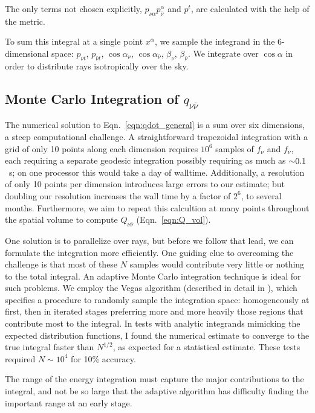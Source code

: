 The only terms not chosen explicitly, $p_{\nu \alpha} p_{\bar{\nu}}^\alpha$
and $p^t$, are calculated with the help of the metric.

To sum this integral at a single point $x^\alpha$,
we sample the integrand in the 6-dimensional space:
$p_{\nu t}$,
$p_{\bar{\nu} t}$,
$\cos \alpha_{\nu}$,
$\cos \alpha_{\bar{\nu}}$,
$\beta_{\nu}$,
$\beta_{\bar{\nu}}$.
We integrate over $\cos \alpha$ in order to distribute rays isotropically over
the sky.

\subsection{Monte Carlo Integration of $q_{\nu\bar{\nu}}$}
\label{ssec:monte_carlo}
The numerical solution to Eqn.~\ref{eqn:qdot_general} is a sum over
six dimensions, a steep computational challenge.
A straightforward trapezoidal integration with a grid of only 10
points along each dimension requires $10^6$ samples of $f_\nu$ and
$f_{\bar{\nu}}$, each requiring a separate geodesic integration possibly
requiring as much as $\mathord{\sim}0.1$~s;
on one processor this would take a day of walltime.
Additionally, a resolution of only 10 points per dimension introduces large
errors to our estimate; but doubling our resolution increases the wall time
by a factor of $2^6$, to several months.
Furthermore, we aim to repeat this calcultion at many points throughout the
spatial volume to compute $Q_{\nu\bar{\nu}}$ (Eqn.~\ref{eqn:Q_vol}).

One solution is to parallelize over rays, but before we follow that lead, we
can formulate the integration more efficiently.
One guiding clue to overcoming the challenge is that most of these $N$
samples would contribute very little or nothing to the total integral.
An adaptive Monte Carlo integration technique is ideal for such problems.
We employ the Vegas algorithm
(described in detail in \citealt[Sec.~7.9]{pres2007-nr_3rd_ed}),
which specifies a procedure to randomly sample the integration space:
homogeneously at first, then in iterated stages preferring more and more
heavily those regions that contribute most to the integral.
In tests with analytic integrands mimicking the expected distribution functions,
I found the numerical estimate to converge to the true integral faster than
$N^{1/2}$, as expected for a statistical estimate. These tests required
$N\sim10^4$ for 10\% accuracy.

The range of the energy integration must capture the major contributions to the
integral, and not be so large that the adaptive algorithm has difficulty
finding the important range at an early stage.

